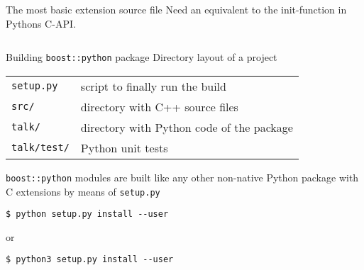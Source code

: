 
\begin{frame}[fragile]{The most basic extension source file}
Need an equivalent to the init-function in Pythons C-API.

\inputminted[fontsize=\tiny,linenos,
             firstline=20,
             lastline=42]{cpp}{../src/python-talk/src/functions.cpp}

\end{frame}

\begin{frame}[fragile]{Building \texttt{boost::python} package}
    Directory layout of a project
    \begin{center}
        \begin{tabular}{ll}
            \texttt{setup.py} & script to finally run the build \\
            \texttt{src/}     & directory with C++ source files \\
            \texttt{talk/}    & directory with Python code of the package \\
            \texttt{talk/test/}    & Python unit tests \\
        \end{tabular}
    \end{center}
    \vspace{0.05\textheight}
    \texttt{boost::python} modules are built like any other non-native 
    Python package with C extensions by means of \texttt{setup.py}
    \vspace{0.05\textheight}
    \begin{verbatim}
$ python setup.py install --user 
    \end{verbatim}
    or 
    \begin{verbatim}
$ python3 setup.py install --user
    \end{verbatim}
\end{frame}


